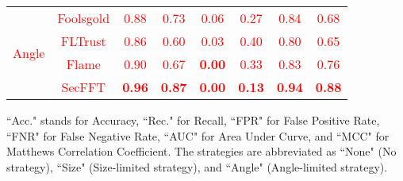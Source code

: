 \documentclass[lettersize,journal]{IEEEtran}
\begin{document}
\begin{table}[h!]
{\begin{tabular}{c|c|c|c|c|c|c|c}
\multirow{4}{*}{\textcolor{red}{Angle}} & \textcolor{red}{Foolsgold} & \textcolor{red}{0.88} & \textcolor{red}{0.73} & \textcolor{red}{0.06} & \textcolor{red}{0.27} & \textcolor{red}{0.84} & \textcolor{red}{0.68} \\ 
                       & \textcolor{red}{FLTrust}   & \textcolor{red}{0.86} & \textcolor{red}{0.60} & \textcolor{red}{0.03} & \textcolor{red}{0.40} & \textcolor{red}{0.80} & \textcolor{red}{0.65} \\ 
                       & \textcolor{red}{Flame}     & \textcolor{red}{0.90} & \textcolor{red}{0.67} & \textbf{\textcolor{red}{0.00}} & \textcolor{red}{0.33} & \textcolor{red}{0.83} & \textcolor{red}{0.76} \\ 
                       & \textcolor{red}{SecFFT}    & \textbf{\textcolor{red}{0.96}} & \textbf{\textcolor{red}{0.87}} & \textbf{\textcolor{red}{0.00}} & \textbf{\textcolor{red}{0.13}} & \textbf{\textcolor{red}{0.94}} & \textbf{\textcolor{red}{0.88}} \\ \hline
\end{tabular}
}
\vspace{1em}
\begin{tablenotes}
\scriptsize
\item ``Acc." stands for Accuracy, ``Rec." for Recall, ``FPR" for False Positive Rate, ``FNR" for False Negative Rate, ``AUC" for Area Under Curve, and ``MCC" for Matthews Correlation Coefficient. The strategies are abbreviated as ``None" (No strategy), ``Size" (Size-limited strategy), and ``Angle" (Angle-limited strategy).
\end{tablenotes}
\label{tab:detect}
\end{table}
\end{document}
